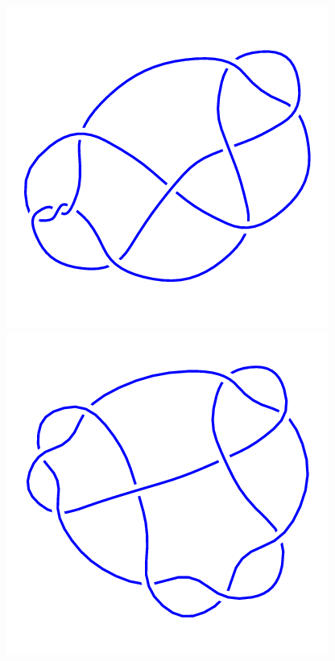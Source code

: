 \begin{figure}[H]
    \begin{minipage}[b]{.18\linewidth}
        \centering
        \includegraphics[width=\linewidth]{../data/10_27.png}
    \end{minipage}
    \begin{minipage}[b]{.18\linewidth}
        \centering
        \includegraphics[width=\linewidth]{../data/10_28.png}

\end{minipage}
\end{figure}
